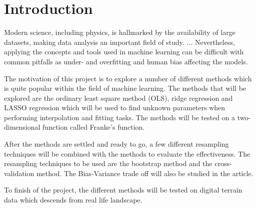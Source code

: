 \documentclass[../main.tex]{subfiles}
\begin{document}
\section{Introduction}\label{sec:introduction}
Modern science, including physics, is hallmarked by the availability of large datasets, making data analysis an important field of study. ...
Nevertheless, applying the concepts and tools used in machine learning can be difficult with common pitfalls as under- and overfitting and human bias affecting the models.

The motivation of this project is to explore a number of different methods which is quite popular within the field of machine learning. The methods that will be explored are the ordinary least square method (OLS), ridge regression and LASSO regression which will be used to find unknown parameters when performing interpolation and fitting tasks. The methods will be tested on a two-dimensional function called Franke’s function.

After the methods are settled and ready to go, a few different resampling techniques will be combined with the methods to evaluate the effectiveness. The resampling techniques to be used are the bootstrap method and the cross-validation method. The Bias-Variance trade off will also be studied in the article.

To finish of the project, the different methods will be tested on digital terrain data which descends from real life landscape.
\end{document}
